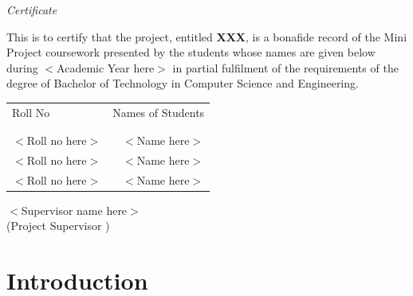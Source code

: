 \documentclass[12pt]{article}
\begin{document}
\begin{center}
	
	\emph{\huge{Certificate}}\\[2.5cm]
\end{center}
\normalsize This is to certify that the project, entitled \textbf{XXX}, is a bonafide record of the Mini Project coursework presented by the students whose names are given below during $<$Academic Year here$>$ in partial fulfilment of the requirements of the degree of Bachelor of Technology in Computer Science and Engineering.\\[1.0cm]

\begin{table}[h]
	\centering
	\begin{tabular}{lr}
		Roll No & Names of Students \\ \\ \hline
		\\
		$<$Roll no here$>$ &$<$Name here$>$ \\ 
		$<$Roll no here$>$ &$<$Name here$>$ \\ 
		$<$Roll no here$>$ &$<$Name here$>$ \\ 
	\end{tabular}
\end{table}

\vfill


\begin{flushright}
	$<$Supervisor name here$>$\\
	(Project Supervisor )\\[1.5cm]
\end{flushright}

\newpage
{}
\setcounter{page}{1}
\tableofcontents
\newpage
\listoffigures
\newpage
\listoftables



\newpage
\thispagestyle{empty}
\clearpage             %
\thispagestyle{empty}  %
\phantom{a}            %
\newpage



\section{Introduction}
\newpage
\end{document}
